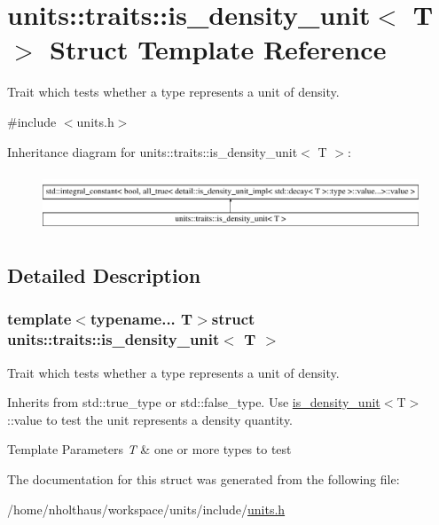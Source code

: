 \hypertarget{structunits_1_1traits_1_1is__density__unit}{}\section{units\+:\+:traits\+:\+:is\+\_\+density\+\_\+unit$<$ T $>$ Struct Template Reference}
\label{structunits_1_1traits_1_1is__density__unit}


Trait which tests whether a type represents a unit of density.  




{\ttfamily \#include $<$units.\+h$>$}

Inheritance diagram for units\+:\+:traits\+:\+:is\+\_\+density\+\_\+unit$<$ T $>$\+:\begin{figure}[H]
\begin{center}
\leavevmode
\includegraphics[height=1.772152cm]{structunits_1_1traits_1_1is__density__unit}
\end{center}
\end{figure}


\subsection{Detailed Description}
\subsubsection*{template$<$typename... T$>$struct units\+::traits\+::is\+\_\+density\+\_\+unit$<$ T $>$}

Trait which tests whether a type represents a unit of density. 

Inherits from {\ttfamily std\+::true\+\_\+type} or {\ttfamily std\+::false\+\_\+type}. Use {\ttfamily \hyperlink{structunits_1_1traits_1_1is__density__unit}{is\+\_\+density\+\_\+unit}$<$T$>$\+::value} to test the unit represents a density quantity. 
\begin{DoxyTemplParams}{Template Parameters}
{\em T} & one or more types to test \\
\hline
\end{DoxyTemplParams}


The documentation for this struct was generated from the following file\+:\begin{DoxyCompactItemize}
\item 
/home/nholthaus/workspace/units/include/\hyperlink{units_8h}{units.\+h}\end{DoxyCompactItemize}

